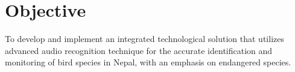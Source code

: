 
\section{Objective}
\begin{enumerate}[label=\roman*]
    To develop and implement an integrated technological solution that utilizes
          advanced audio recognition technique for the accurate identification and
          monitoring of bird species in Nepal, with an emphasis on endangered species.
\end{enumerate}

